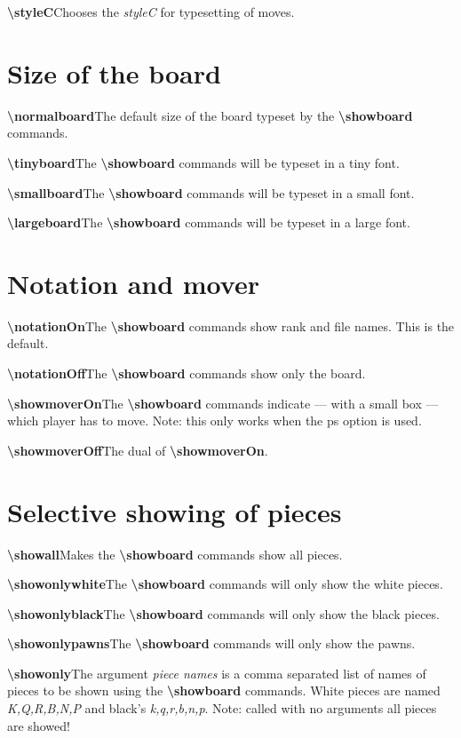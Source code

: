 \documentclass[10pt,a4paper,twocolumn,landscape]{article}
\newcommand{\Cmd}[1]{\textsf{\textbf{\textbackslash#1}}}
\newcommand{\Arg}[1]{\textsf{\textsl{#1}}}
\newcommand{\ArgInDescription}[1]{\Arg{\{#1\}}}
\newcommand{\command}[3]{\Cmd{#1}\Apply{\ArgInDescription}{\Listize[#2]}\newline#3\smallskip}
\newcommand{\simpleCommand}[2]{\Cmd{#1}\newline#2\smallskip}
\begin{document}
\simpleCommand{styleC}
{Chooses the \Arg{styleC} for typesetting of moves.}




\section{Size of the board}



\simpleCommand{normalboard}
{The default size of the board typeset by the \Cmd{showboard}
  commands.}

\newcommand{\boardsize}[1]{
\simpleCommand{#1board}
{The \Cmd{showboard} commands will be typeset in a #1 font.}}

\boardsize{tiny}

\boardsize{small}

\boardsize{large}

\section{Notation and mover}

\simpleCommand{notationOn}
{The \Cmd{showboard} commands show rank and file names. This is the
  default.}

\simpleCommand{notationOff}
{The \Cmd{showboard} commands show only the board.}

\simpleCommand{showmoverOn}
{The \Cmd{showboard} commands indicate --- with a small box --- which
  player has to move. Note: this only works when the ps option is used.}

\simpleCommand{showmoverOff}
{The dual of \Cmd{showmoverOn}.}



\section{Selective showing of pieces}

\simpleCommand{showall}
{Makes the \Cmd{showboard} commands show all pieces.}

\simpleCommand{showonlywhite}
{The \Cmd{showboard} commands will only show the white pieces.}

\simpleCommand{showonlyblack}
{The \Cmd{showboard} commands will only show the black pieces.}

\simpleCommand{showonlypawns}
{The \Cmd{showboard} commands will only show the pawns.}

\command{showonly}{piece names}
{The argument \Arg{piece names} is a comma separated list of names of
  pieces to be shown using the \Cmd{showboard} commands. White pieces
  are named \Arg{K,Q,R,B,N,P} and black's \Arg{k,q,r,b,n,p}. Note: called with no arguments all pieces are showed!}
\end{document}
